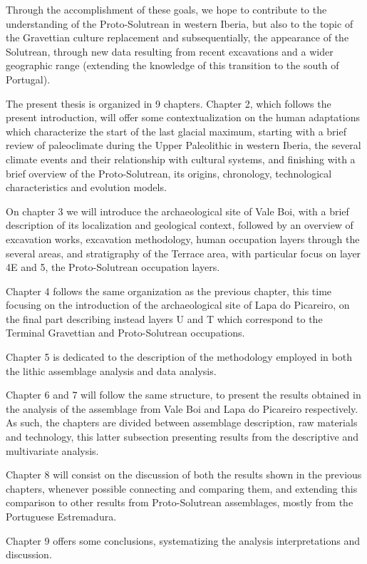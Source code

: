 \documentclass[12pt,twoside]{reedthesis}
\begin{document}
Through the accomplishment of these goals, we hope to contribute to the understanding of the Proto-Solutrean in western Iberia, but also to the topic of the Gravettian culture replacement and subsequentially, the appearance of the Solutrean, through new data resulting from recent excavations and a wider geographic range (extending the knowledge of this transition to the south of Portugal).

The present thesis is organized in 9 chapters. Chapter 2, which follows the present introduction, will offer some contextualization on the human adaptations which characterize the start of the last glacial maximum, starting with a brief review of paleoclimate during the Upper Paleolithic in western Iberia, the several climate events and their relationship with cultural systems, and finishing with a brief overview of the Proto-Solutrean, its origins, chronology, technological characteristics and evolution models.

On chapter 3 we will introduce the archaeological site of Vale Boi, with a brief description of its localization and geological context, followed by an overview of excavation works, excavation methodology, human occupation layers through the several areas, and stratigraphy of the Terrace area, with particular focus on layer 4E and 5, the Proto-Solutrean occupation layers.

Chapter 4 follows the same organization as the previous chapter, this time focusing on the introduction of the archaeological site of Lapa do Picareiro, on the final part describing instead layers U and T which correspond to the Terminal Gravettian and Proto-Solutrean occupations.

Chapter 5 is dedicated to the description of the methodology employed in both the lithic assemblage analysis and data analysis.

Chapter 6 and 7 will follow the same structure, to present the results obtained in the analysis of the assemblage from Vale Boi and Lapa do Picareiro respectively. As such, the chapters are divided between assemblage description, raw materials and technology, this latter subsection presenting results from the descriptive and multivariate analysis.

Chapter 8 will consist on the discussion of both the results shown in the previous chapters, whenever possible connecting and comparing them, and extending this comparison to other results from Proto-Solutrean assemblages, mostly from the Portuguese Estremadura.

Chapter 9 offers some conclusions, systematizing the analysis interpretations and discussion.
\end{document}
